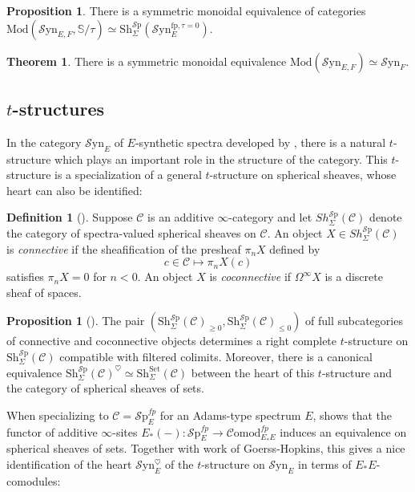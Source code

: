 \documentclass[10pt]{amsart}
\theoremstyle{definition}
\numberwithin{figure}{section}
\numberwithin{equation}{section}
\newtheorem{theorem}[figure]{Theorem}
\newtheorem{proposition}[figure]{Proposition}
\newtheorem{definition}[figure]{Definition}
\newcommand{\cC}{\mathcal{C}}
\theoremstyle{cited}
\newcommand{\bS}{\mathbb{S}}
\newcommand{\Sp}{{\mathcal{S}\mathrm{p}}}
\newcommand{\Mod}{\mathrm{Mod}}
\newcommand{\Sh}{\mathrm{Sh}}
\newcommand{\fp}{\mathrm{fp}}
\newcommand{\Syn}{\mathcal{S}\mathrm{yn}}
\newcommand{\Comod}{\mathcal{C}\mathrm{omod}}
\begin{document}
\begin{proposition}
  There is a symmetric monoidal equivalence  of categories $\Mod(\Syn_{E,F}, \bS/\tau)\simeq \Sh_{\Sigma}^\Sp(\Syn_E^{\fp, \tau=0})$.
\end{proposition}

\begin{theorem}
  There is a symmetric monoidal equivalence $\Mod(\Syn_{E,F})\simeq \Syn_F$.
\end{theorem}


\subsection{$t$-structures}

In the category $\Syn_E$ of $E$-synthetic spectra developed by \cite{Pst22}, there is a natural $t$-structure which plays an important role in the structure of the category. This $t$-structure is a specialization of a general $t$-structure on spherical sheaves, whose heart can also be identified:

\begin{definition}[\cite{Pst22}]
\label{con_cocon_defin}
Suppose $\cC$ is an additive $\infty$-category and let $Sh_{\Sigma}^{\Sp}(\cC)$ denote the category of spectra-valued spherical sheaves on $\cC$. An object $X\in Sh_{\Sigma}^{\Sp}(\cC)$ is \textit{connective} if the sheafification of the presheaf $\pi_nX$ defined by
$$
c\in\cC\mapsto \pi_nX(c)
$$
satisfies $\pi_nX=0$ for $n<0$. An object $X$ is \textit{coconnective} if $\Omega^{\infty}X$ is a discrete sheaf of spaces.
\end{definition}

\begin{proposition}[\cite{Pst22}]
\label{general_sheaf_tstruct_prop}
The pair $(\Sh_{\Sigma}^{\Sp}(\cC)_{\geq 0},\Sh_{\Sigma}^{\Sp}(\cC)_{\leq 0})$ of full subcategories of connective and coconnective objects determines a right
complete $t$-structure on $\Sh_{\Sigma}^{\Sp}(\cC)$ compatible with filtered colimits. Moreover, there is a canonical equivalence $\Sh_{\Sigma}^{\Sp}(\cC)^\heartsuit\simeq \Sh_{\Sigma}^{\mathrm{Set}}(\cC)$ between the heart of this $t$-structure and the category of
spherical sheaves of sets.
\end{proposition}

When specializing to $\cC=\Sp_E^{fp}$ for an Adams-type spectrum $E$, \cite{Pst22} shows that the functor of additive $\infty$-sites $E_*(-):\Sp_E^{fp}\to\Comod_{E_*E}^{fp}$ induces an equivalence on spherical sheaves of sets. Together with work of Goerss-Hopkins, this gives a nice identification of the heart $\Syn_E^\heartsuit$ of the $t$-structure on $\Syn_E$ in terms of $E_*E$-comodules:
\end{document}
